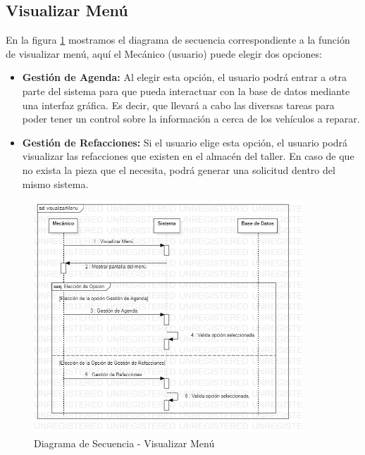 \subsection{Visualizar Menú}
En la figura \ref{fig:Diagrama de Secuencia - Visualizar Menú} mostramos el diagrama de secuencia correspondiente a la función de visualizar menú, aquí el Mecánico (usuario) puede elegir dos opciones:
\begin{itemize}
	\item \textbf{Gestión de Agenda:} Al elegir esta opción, el usuario podrá entrar a otra parte del sistema para que pueda interactuar con la base de datos mediante una interfaz gráfica. Es decir, que llevará a cabo las diversas tareas para poder tener un control sobre la información a cerca de los vehículos a reparar.
	\item \textbf{Gestión de Refacciones:} Si el usuario elige esta opción, el usuario podrá visualizar las refacciones que existen en el almacén del taller. En caso de que no exista la pieza que el necesita, podrá generar una solicitud dentro del mismo sistema. 
\end{itemize}
\begin{figure}[!h]
	\centering
	\includegraphics[width=0.9\textwidth]{./diseno/vprocesos/imagenes/visualizarMenu}
	\caption{Diagrama de Secuencia - Visualizar Menú}
	\label{fig:Diagrama de Secuencia - Visualizar Menú}
\end{figure}